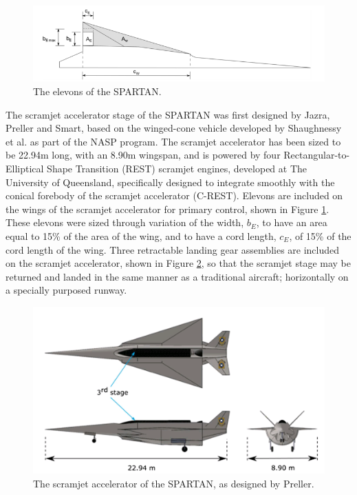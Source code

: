  \begin{figure}[ht]
 	\centering
 	\includegraphics[width=\linewidth]{figures/2_literature-review/SPARTANElevons}
 	\caption{The elevons of the SPARTAN\cite{Preller2017b}.}
 	\label{fig:SPARTANElevons}
 \end{figure}
 
  The scramjet accelerator stage of the SPARTAN was first designed by Jazra, Preller and Smart\cite{Jazra2010, Jazra2013}, based on the winged-cone vehicle developed by Shaughnessy et al. as part of the NASP program\cite{Shaughnessy1990}. 
  The scramjet accelerator has been sized to be 22.94m long, with an 8.90m wingspan, and is powered by four Rectangular-to-Elliptical Shape Transition (REST) scramjet engines, developed at The University of Queensland, specifically designed to integrate smoothly with the conical forebody of the scramjet accelerator (C-REST). Elevons are included on the wings of the scramjet accelerator for primary control, shown in Figure \ref{fig:SPARTANElevons}. These elevons were sized through variation of the width, $b_E$, to have an area equal to 15\% of the area of the wing, and to have a cord length, $c_E$, of 15\% of the cord length of the wing\cite{Preller2018a}.
  Three retractable landing gear assemblies are included on the scramjet accelerator, shown in Figure \ref{fig:SPARTAN-Dawid}, so that the scramjet stage may be returned and landed in the same manner as a traditional aircraft; horizontally on a specially purposed runway. 
  
  \begin{figure}[ht]
  	\centering
  	\includegraphics[width=0.9\linewidth]{figures/2_literature-review/SPARTAN-Dawid}
  	\caption{The scramjet accelerator of the SPARTAN, as designed by Preller\cite{Preller2018a}.}
  	\label{fig:SPARTAN-Dawid}
  \end{figure}
  
